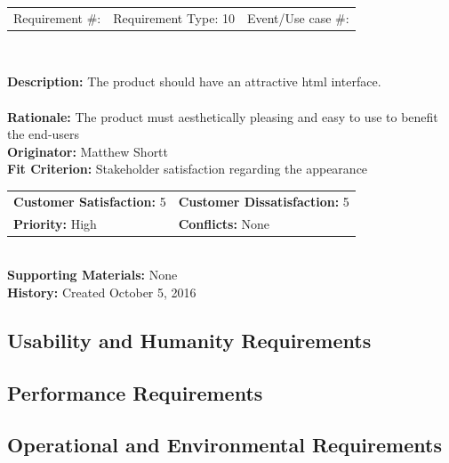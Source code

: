 \documentclass[12pt, titlepage]{article}
\begin{document}
\begin{framed}
	\begin{center}
		\begin{tabular}{ l c r }
			Requirement \#: & Requirement Type: 10 & Event/Use case \#: \\
		\end{tabular} \\
	\end{center}
	\textbf{Description:} The product should have an attractive html interface. \\
	\\
	\textbf{Rationale:} The product must aesthetically pleasing and easy to use
	to benefit the end-users \\
	\textbf{Originator:} Matthew Shortt \\
	\textbf{Fit Criterion:} Stakeholder satisfaction regarding the appearance  \\
	\begin{tabular}{ll}
		\textbf{Customer Satisfaction:} 5 & \textbf{Customer Dissatisfaction:} 5 \\
		\textbf{Priority:} High & \textbf{Conflicts:} None\\
	\end{tabular} \\
	\textbf{Supporting Materials:} None \\
	\textbf{History:} Created October 5, 2016
\end{framed}




\subsection{Usability and Humanity Requirements}

\subsection{Performance Requirements}

\subsection{Operational and Environmental Requirements}
\end{document}
